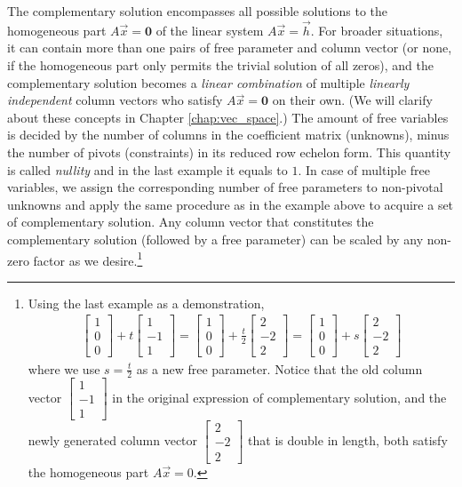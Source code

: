 The complementary solution encompasses all possible solutions to the homogeneous part $A\vec{x} = \textbf{0}$ of the linear system $A\vec{x} = \vec{h}$. For broader situations, it can contain more than one pairs of free parameter and column vector (or none, if the homogeneous part only permits the trivial solution of all zeros), and the complementary solution becomes a \textit{linear combination} of multiple \textit{linearly independent} column vectors who satisfy $A\vec{x} = \textbf{0}$ on their own. (We will clarify about these concepts in Chapter \ref{chap:vec_space}.) The amount of free variables is decided by the number of columns in the coefficient matrix (unknowns), minus the number of pivots (constraints) in its reduced row echelon form. This quantity is called \textit{nullity} and in the last example it equals to $1$. In case of multiple free variables, we assign the corresponding number of free parameters to non-pivotal unknowns and apply the same procedure as in the example above to acquire a set of complementary solution. Any column vector that constitutes the complementary solution (followed by a free parameter) can be scaled by any non-zero factor as we desire.\footnote{Using the last example as a demonstration, 
\begin{align*}
\begin{bmatrix}
1 \\
0 \\
0
\end{bmatrix}
+ t
\begin{bmatrix}
1 \\
-1 \\
1
\end{bmatrix}
=
\begin{bmatrix}
1 \\
0 \\
0
\end{bmatrix}
+ \frac{t}{2}
\begin{bmatrix}
2 \\
-2 \\
2
\end{bmatrix}
=
\begin{bmatrix}
1 \\
0 \\
0
\end{bmatrix}
+ s
\begin{bmatrix}
2 \\
-2 \\
2
\end{bmatrix}
\end{align*} where we use $s = \frac{t}{2}$ as a new free parameter. Notice that the old column vector $\begin{bmatrix}
1 \\
-1 \\
1
\end{bmatrix}$ in the original expression of complementary solution, and the newly generated column vector $\begin{bmatrix}
2 \\
-2 \\
2
\end{bmatrix}$ that is double in length, both satisfy the homogeneous part $A\vec{x} = 0$.} \par
